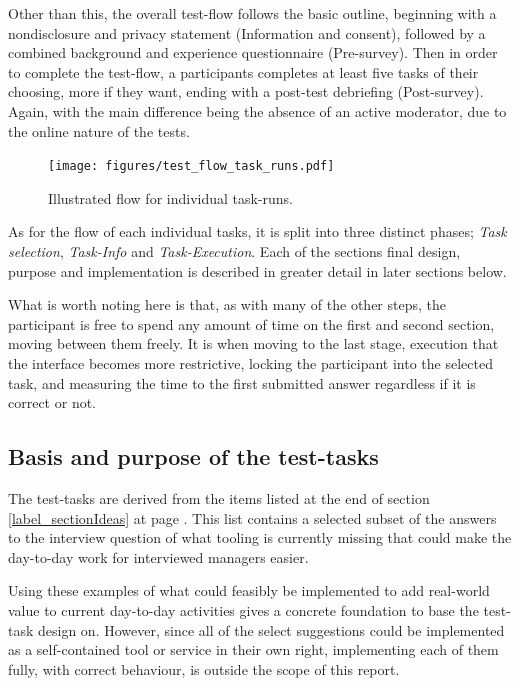 {  Other than this, the overall test-flow follows the basic outline, beginning
  with a nondisclosure and privacy statement (Information and consent),
  followed by a combined background and experience questionnaire (Pre-survey).
  Then in order to complete the test-flow, a participants completes at least
  five tasks of their choosing, more if they want, ending with a post-test
  debriefing (Post-survey). Again, with the main difference being the absence
  of an active moderator, due to the online nature of the tests.

  \begin{figure}[h!]
    \centering
    \texttt{[image: figures/test\_flow\_task\_runs.pdf]}
    \caption{Illustrated flow for individual task-runs.}
  \end{figure}

  As for the flow of each individual tasks, it is split into three distinct phases;
  \textit{Task selection},
  \textit{Task-Info} and
  \textit{Task-Execution}.
  Each of the sections final design, purpose and implementation is
  described in greater detail in later sections below.

  What is worth noting here is that, as with many of the other steps, the
  participant is free to spend any amount of time on the first and second
  section, moving between them freely. It is when moving to the last stage,
  execution that the interface becomes more restrictive, locking the
  participant into the selected task, and measuring the time to the first
  submitted answer regardless if it is correct or not.

  \subsection{Basis and purpose of the test-tasks}

  The test-tasks are derived from the items listed at the
  end of section \ref{label_sectionIdeas} at page \pageref{label_ideas}.
  This list contains a selected subset of the answers to the
  interview question of what tooling is currently missing that could make
  the day-to-day work for interviewed managers easier.

  Using these examples of what could feasibly be implemented to add
  real-world value to current day-to-day activities gives a concrete
  foundation to base the test-task design on. However, since all of
  the select suggestions could be implemented as a self-contained tool or
  service in their own right, implementing each of them fully, with
  correct behaviour, is outside the scope of this report.

}

